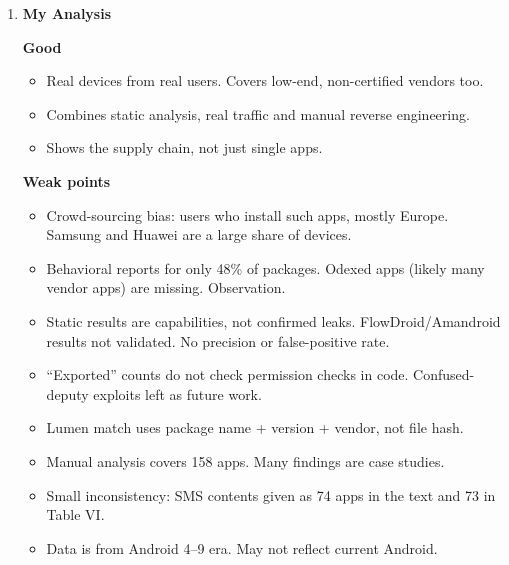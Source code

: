\documentclass[11pt,a4paper]{article}
\newcommand{\entrypart}[1]{\textbf{\color{accent}#1}\par\vspace{2pt}}
\begin{document}
\begin{enumerate}
    \vspace{4pt}
    \textbf{Limitations (authors)}
    \begin{itemize}
        \item Dataset not complete across vendors and models. Best-effort collection.
        \item No reliable way to attribute apps from self-signed certificates.
        \item No documentation for custom permissions, so analysis was semi-manual.
        \item \texttt{packages.xml} not collected (privacy), so use of pre-installed services by user apps not seen.
        \item Mainly static analysis. Dynamic data only for 1,055 packages. Code loading and reflection missed, so results are a lower bound.
        \item Rooted-device detection not certain. Cannot always tell if malware was pre-installed or installed later.
        \item Root certificates and libraries left for future work.
    \end{itemize}

    \item \entrypart{My Analysis}

    \textbf{Good}
    \begin{itemize}
        \item Real devices from real users. Covers low-end, non-certified vendors too.
        \item Combines static analysis, real traffic and manual reverse engineering.
        \item Shows the supply chain, not just single apps.
    \end{itemize}

    \vspace{4pt}
    \textbf{Weak points}
    \begin{itemize}
        \item Crowd-sourcing bias: users who install such apps, mostly Europe. Samsung and Huawei are a large share of devices.
        \item Behavioral reports for only 48\% of packages. Odexed apps (likely many vendor apps) are missing. Observation.
        \item Static results are capabilities, not confirmed leaks. FlowDroid/Amandroid results not validated. No precision or false-positive rate.
        \item ``Exported'' counts do not check permission checks in code. Confused-deputy exploits left as future work.
        \item Lumen match uses package name + version + vendor, not file hash.
        \item Manual analysis covers 158 apps. Many findings are case studies.
        \item Small inconsistency: SMS contents given as 74 apps in the text and 73 in Table VI.
        \item Data is from Android 4--9 era. May not reflect current Android.
    \end{itemize}


\end{enumerate}
\end{document}
